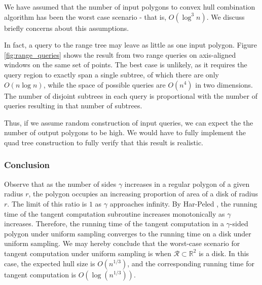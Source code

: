 \documentclass{article}
\begin{document}
We have assumed that the number of input polygons to convex hull combination algorithm has been the worst case scenario - that is, $O(\log^3 n)$. We discuss briefly concerns about this assumptions.

In fact, a query to the range tree may leave as little as one input polygon. Figure \ref{fig:range_queries} shows the result from two range queries on axis-aligned windows on the same set of points. The best case is unlikely, as it requires the query region to exactly span a single subtree, of which there are only $O(n\log n)$, while the space of possible queries are $O(n^4)$ in two dimensions. The number of disjoint subtrees in each query is proportional with the number of queries resulting in that number of subtrees.

Thus, if we assume random construction of input queries, we can expect the the number of output polygons to be high. We would have to fully implement the quad tree construction to fully verify that this result is realistic.

\subsubsection{Conclusion} \label{subsub:polygon_convergence_to_disk}

Observe that as the number of sides $\gamma$ increases in a regular polygon of a given radius $r$, the polygon occupies an increasing proportion of area of a disk of radius $r$. The limit of this ratio is $1$ as $\gamma$ approaches infinity. By Har-Peled \cite{hp11}, the running time of the tangent computation subroutine increases monotonically as $\gamma$ increases. Therefore, the running time of the tangent computation in a $\gamma$-sided polygon under uniform sampling converges to the running time on a disk under uniform sampling. We may hereby conclude that the worst-case scenario for tangent computation under uniform sampling is when $\mathcal{R} \subset \mathbb{R}^2$ is a disk. In this case, the expected hull size is $O(n^{1/3})$, and the corresponding running time for tangent computation is $O(\log (n^{1/3}))$.
\end{document}
